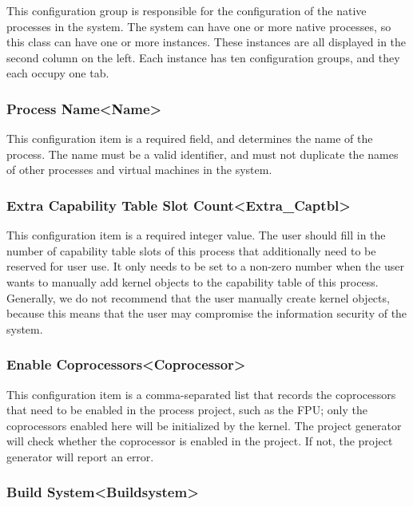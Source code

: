 This configuration group is responsible for the configuration of the native processes in the system. The system can have one or more native processes, so this class can have one or more instances. These instances are all displayed in the second column on the left. Each instance has ten configuration groups, and they each occupy one tab.

\subsubsection{Process Name<Name>{}}\label{subsubsec:5-3-14-1}

This configuration item is a required field, and determines the name of the process. The name must be a valid identifier, and must not duplicate the names of other processes and virtual machines in the system.

\subsubsection{Extra Capability Table Slot Count<Extra\_Captbl>{}}\label{subsubsec:5-3-14-2}

This configuration item is a required integer value. The user should fill in the number of capability table slots of this process that additionally need to be reserved for user use. It only needs to be set to a non-zero number when the user wants to manually add kernel objects to the capability table of this process. Generally, we do not recommend that the user manually create kernel objects, because this means that the user may compromise the information security of the system.

\subsubsection{Enable Coprocessors<Coprocessor>{}}\label{subsubsec:5-3-14-3}

This configuration item is a comma-separated list that records the coprocessors that need to be enabled in the process project, such as the FPU; only the coprocessors enabled here will be initialized by the kernel. The project generator will check whether the coprocessor is enabled in the project. If not, the project generator will report an error.

\subsubsection{Build System<Buildsystem>{}}\label{subsubsec:5-3-14-4}

